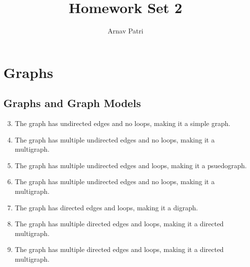 \documentclass[12pt, A4]{article}
\title{Homework Set 2}
\author{Arnav Patri}
\newcommand{\enumset}[1]{\setcounter{enumi}{#1}}
\begin{document}
	\maketitle
	
	\setcounter{section}{9}
	\section{Graphs}
		\subsection{Graphs and Graph Models}
			\begin{enumerate}
				\enumset{2}
				\item
					The graph has undirected edges and no loops, making it a simple graph.
				\item
					The graph has multiple undirected edges and no loops, making it a multigraph.
				\item
					The graph has multiple undirected edges and loops, making it a psuedograph.
				\item
					The graph has multiple undirected edges and no loops, making it a multigraph.
				\item
					The graph has directed edges and loops, making it a digraph.
				\item
					The graph has multiple directed edges and loops, making it a directed multigraph.
				\item
					The graph has multiple directed edges and loops, making it a directed multigraph.
			\end{enumerate}
\end{document}

